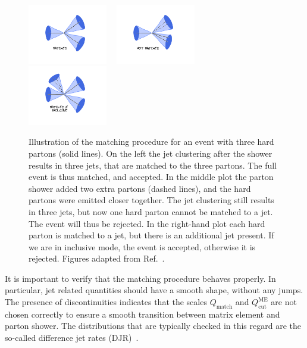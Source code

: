 \begin{figure}[htpb]
  \centering
  \includegraphics[width=0.31\textwidth, clip=true, trim=4cm 3cm 4cm 2cm]
  {figures/eventreco_generation/matching1}
  ~
  \includegraphics[width=0.31\textwidth, clip=true, trim=4cm 3cm 4cm 2cm]
  {figures/eventreco_generation/matching2}
  ~
  \includegraphics[width=0.31\textwidth, clip=true, trim=4cm 3cm 4cm 2cm]
  {figures/eventreco_generation/matching3}
  \caption{Illustration of the matching procedure for an event with three hard partons (solid
lines). On the left the jet clustering after the shower results in three jets, that are matched to
the three partons. The full event is thus matched, and accepted. In the middle plot the parton
shower added two extra partons (dashed lines), and the hard partons were emitted closer together.
The jet clustering still results in three jets, but now one hard parton cannot be matched to a jet.
The event will thus be rejected. In the right-hand plot each hard parton is matched to a jet, but
there is an additional jet present. If we are in inclusive mode, the event is accepted, otherwise
it is rejected.  
  Figures adapted from Ref.~\cite{mlm_plots}. 
  \label{fig:matching}}
\end{figure}


It is important to verify that the matching procedure behaves properly. In particular, jet related
quantities should have a smooth shape, without any jumps. The presence of discontinuities indicates
that the scales $Q_{\mathrm{match}}$ and $Q_{\mathrm{cut}}^{\mathrm{ME}}$ are not chosen
correctly to ensure a smooth transition between matrix element and parton shower. The distributions
that are typically checked in this regard are the so-called difference jet rates
(DJR)~\cite{Alwall:2008qv}. 

